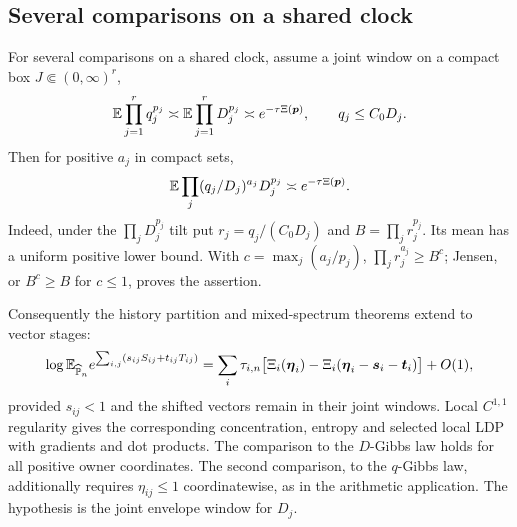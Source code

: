 \subsection{Several comparisons on a shared clock}\label{fp:subsec:grouped}
For several comparisons on a shared clock, assume a joint window on a compact box $J\Subset(0,\infty)^r$,
\begin{equation}\label{fp:eq:joint-window}
 \mathbb E\prod_{j=1}^r q_j^{p_j}
 \asymp\mathbb E\prod_{j=1}^rD_j^{p_j}
 \asymp e^{-\tau\Xi(\boldsymbol p)},
 \qquad q_j\le C_0D_j.
\end{equation}
Then for positive $a_j$ in compact sets,
\begin{equation}\label{fp:eq:grouped-power}
 \mathbb E\prod_j(q_j/D_j)^{a_j}D_j^{p_j}
 \asymp e^{-\tau\Xi(\boldsymbol p)}.
\end{equation}
Indeed, under the $\prod_jD_j^{p_j}$ tilt put $r_j=q_j/(C_0D_j)$ and $B=\prod_jr_j^{p_j}$. Its mean has a uniform positive lower bound. With $c=\max_j(a_j/p_j)$, $\prod_jr_j^{a_j}\ge B^c$; Jensen, or $B^c\ge B$ for $c\le1$, proves the assertion.

Consequently the history partition and mixed-spectrum theorems extend to vector stages:
\begin{equation}\label{fp:eq:grouped-history}
 \log\mathbb E_{\widehat{\mathbb P}_n}e^{\sum_{i,j}(s_{ij}S_{ij}+t_{ij}T_{ij})}
 =\sum_i\tau_{i,n}
 \bigl[\Xi_i(\boldsymbol\eta_i)
 -\Xi_i(\boldsymbol\eta_i-\boldsymbol s_i-\boldsymbol t_i)\bigr]+O(1),
\end{equation}
provided $s_{ij}<1$ and the shifted vectors remain in their joint windows. Local $C^{1,1}$ regularity gives the corresponding concentration, entropy and selected local LDP with gradients and dot products. The comparison to the $D$-Gibbs law holds for all positive owner coordinates. The second comparison, to the $q$-Gibbs law, additionally requires $\eta_{ij}\le1$ coordinatewise, as in the arithmetic application. The hypothesis is the joint envelope window for $D_j$.


